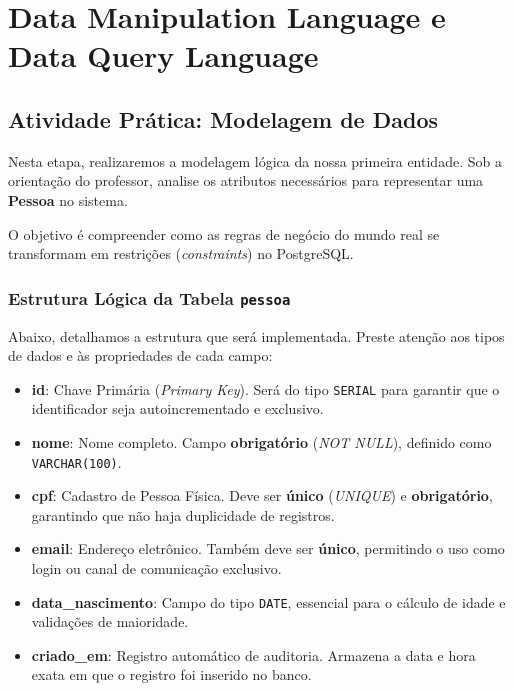 

\chapter{Data Manipulation Language e Data Query Language}
\label{cap:dml_dql}

\section{Atividade Prática: Modelagem de Dados}

\begin{tcolorbox}[colback=green!5,colframe=green!40!black,title=Exercício Dirigido com o Professor]
Nesta etapa, realizaremos a modelagem lógica da nossa primeira entidade. Sob a orientação do professor, analise os atributos necessários para representar uma \textbf{Pessoa} no sistema. 

O objetivo é compreender como as regras de negócio do mundo real se transformam em restrições (\textit{constraints}) no PostgreSQL.
\end{tcolorbox}

\subsection{Estrutura Lógica da Tabela \texttt{pessoa}}

Abaixo, detalhamos a estrutura que será implementada. Preste atenção aos tipos de dados e às propriedades de cada campo:

\begin{itemize}
    \item \textbf{id}: Chave Primária (\textit{Primary Key}). Será do tipo \texttt{SERIAL} para garantir que o identificador seja autoincrementado e exclusivo.
    \item \textbf{nome}: Nome completo. Campo \textbf{obrigatório} (\textit{NOT NULL}), definido como \texttt{VARCHAR(100)}.
    \item \textbf{cpf}: Cadastro de Pessoa Física. Deve ser \textbf{único} (\textit{UNIQUE}) e \textbf{obrigatório}, garantindo que não haja duplicidade de registros.
    \item \textbf{email}: Endereço eletrônico. Também deve ser \textbf{único}, permitindo o uso como login ou canal de comunicação exclusivo.
    \item \textbf{data\_nascimento}: Campo do tipo \texttt{DATE}, essencial para o cálculo de idade e validações de maioridade.
    \item \textbf{criado\_em}: Registro automático de auditoria. Armazena a data e hora exata em que o registro foi inserido no banco.
\end{itemize}



